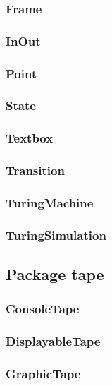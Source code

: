 \documentclass[%
  a4paper,%
  11pt,%
  blue,%
  hyperref	%
  ]{tubsartcl}
\begin{document}
\subsubsection{Frame}

\subsubsection{InOut}

\subsubsection{Point}

\subsubsection{State}

\subsubsection{Textbox}

\subsubsection{Transition}

\subsubsection{TuringMachine}

\subsubsection{TuringSimulation}


\subsection{Package tape}

\subsubsection{ConsoleTape}

\subsubsection{DisplayableTape}

\subsubsection{GraphicTape}
\end{document}
